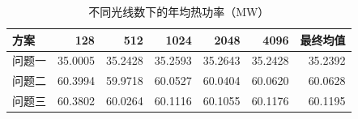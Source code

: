\begin{table}[htbp]
\centering\small
\caption{不同光线数下的年均热功率（MW）}\label{tab:convergence}
\begin{tabular}{lrrrrrr}
\toprule
方案 & 128 & 512 & 1024 & 2048 & 4096 & 最终均值\\\midrule
问题一 & 35.0005 & 35.2428 & 35.2593 & 35.2643 & 35.2428 & 35.2392\\
问题二 & 60.3994 & 59.9718 & 60.0527 & 60.0404 & 60.0620 & 60.0628\\
问题三 & 60.3802 & 60.0264 & 60.1116 & 60.1055 & 60.1176 & 60.1195\\
\bottomrule
\end{tabular}
\end{table}
